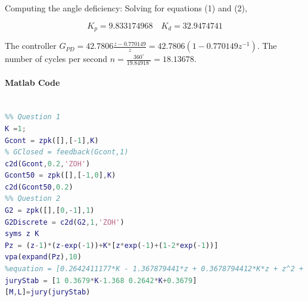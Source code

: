 {Computing the angle deficiency:
Solving for equations (1) and (2),

\[ 
K_p=9.833174968 \quad  K_d=32.9474741
\]

The controller $\displaystyle G_{PD}=42.7806\frac{z-0.770149}{z} = 42.7806(1-0.770149z^{-1})$. The number of cycles per second $n=\frac{360^\circ}{19.84918^\circ}=18.13678$.


\paragraph{Matlab Code}
\begin{lstlisting}[language=Matlab,caption=Matlab Code for B-2-17]
%% ELEC 460 Assignment 4

%% Question 1
K =1;
Gcont = zpk([],[-1],K)
% GClosed = feedback(Gcont,1)
c2d(Gcont,0.2,'ZOH')
Gcont50 = zpk([],[-1,0],K)
c2d(Gcont50,0.2)
%% Question 2 
G2 = zpk([],[0,-1],1)
G2Discrete = c2d(G2,1,'ZOH')
syms z K
Pz = (z-1)*(z-exp(-1))+K*[z*exp(-1)+(1-2*exp(-1))]
vpa(expand(Pz),10)
%equation = [0.2642411177*K - 1.367879441*z + 0.3678794412*K*z + z^2 + 0.3678794412]
juryStab = [1 0.3679*K-1.368 0.2642*K+0.3679]
[M,L]=jury(juryStab)


\end{lstlisting}}
